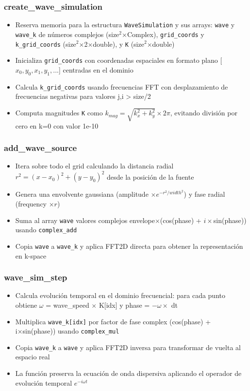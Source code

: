 \documentclass[a4paper]{article}
\begin{document}
\subsubsection{create\_wave\_simulation}
\begin{itemize}
    \item Reserva memoria para la estructura \texttt{WaveSimulation} y sus arrays: \texttt{wave} y \texttt{wave\_k} de números complejos (size$^2$×Complex), \texttt{grid\_coords} y \texttt{k\_grid\_coords} (size$^2$×2×double), y \texttt{K} (size$^2$×double)
    \item Inicializa \texttt{grid\_coords} con coordenadas espaciales en formato plano [$x_0,y_0,x_1,y_1,...$] centradas en el dominio
    \item Calcula \texttt{k\_grid\_coords} usando frecuencias FFT con desplazamiento de frecuencias negativas para valores j,i > size/2
    \item Computa magnitudes \texttt{K} como $k_{mag} = \sqrt{k_x^2 + k_y^2} \times 2\pi$, evitando división por cero en k=0 con valor 1e-10
\end{itemize}

\subsubsection{add\_wave\_source}
\begin{itemize}
    \item Itera sobre todo el grid calculando la distancia radial $r^2 = (x-x_0)^2 + (y-y_0)^2$ desde la posición de la fuente
    \item Genera una envolvente gaussiana (amplitude $\times e^{-r^2/width^2}$) y fase radial (frequency $\times r$)
    \item Suma al array \texttt{wave} valores complejos envelope$\times$(cos(phase) + $i\times$sin(phase)) usando \texttt{complex\_add}
    \item Copia \texttt{wave} a \texttt{wave\_k} y aplica FFT2D directa para obtener la representación en k-space
\end{itemize}

\subsubsection{wave\_sim\_step}
\begin{itemize}
    \item Calcula evolución temporal en el dominio frecuencial: para cada punto obtiene $\omega$ = wave\_speed $\times$ K[idx] y phase = $-\omega \times$ dt
    \item Multiplica \texttt{wave\_k[idx]} por factor de fase complex (cos(phase) + i×sin(phase)) usando \texttt{complex\_mul}
    \item Copia \texttt{wave\_k} a \texttt{wave} y aplica FFT2D inversa para transformar de vuelta al espacio real
    \item La función preserva la ecuación de onda dispersiva aplicando el operador de evolución temporal $e^{-i\omega t}$
\end{itemize}
\end{document}
